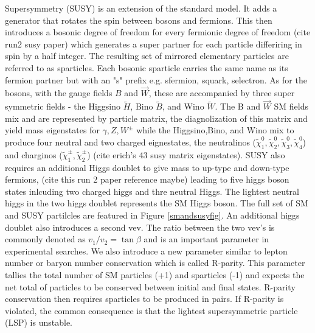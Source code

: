 Supersymmetry (SUSY) is an extension of the standard model. It adds a generator that rotates the spin between bosons and fermions. This then introduces a bosonic degree of freedom for every fermionic degree of freedom (cite run2 susy paper) which generates a super partner for each particle differiring in spin by a half integer.  The resulting set of mirrored elementary particles are referred to as sparticles. Each bosonic sparticle carries the same name as its fermion partner but with an "s" prefix e.g. sfermion, squark, selectron. As for the bosons, with the gauge fields $B$ and $\vec{W}$, these are accompanied by three super symmetric fields - the Higgsino $\tilde{H}$, Bino $\tilde{B}$, and Wino $\tilde{W}$. The B and $\vec{W}$ SM fields mix and are represented by particle matrix, the diagnolization of this matrix and yield mass eigenstates for $\gamma, Z, W^\pm$ while the Higgsino,Bino, and Wino mix to produce four neutral and two charged eignestates, the neutralinos ($\tilde{\chi}^0_1, \tilde{\chi}^0_2, \tilde{\chi}^0_3, \tilde{\chi}^0_4$)  and charginos ($\tilde{\chi}^\pm_1, \tilde{\chi}^\pm_2$) (cite erich's 43 susy matrix eigenstates). SUSY also requires an additional Higgs doublet to give mass to up-type and down-type fermions, (cite this run 2 paper reference maybe) leading to five higgs boson states inlcuding two charged higgs and thre neutral Higgs. The lightest neutral higgs in the two higgs doublet represents the SM Higgs boson. The full set of SM and SUSY partilcles are featured in Figure \ref{smandsusyfig}. An additional higgs doublet also introduces a second vev. The ratio between the two vev's  is commonly denoted as $v_1/v_2 = \tan \beta$ and is an important parameter in experimental searches. We also introduce a new parameter similar to lepton number or baryon number conservation which is called R-parity. This parameter tallies the total number of SM particles (+1) and sparticles (-1) and expects the net total of particles to be conserved between initial and final states. R-parity conservation then requires sparticles to be produced in pairs. If R-parity is violated, the common consequence is that the lightest supersymmetric particle (LSP) is unstable. 




